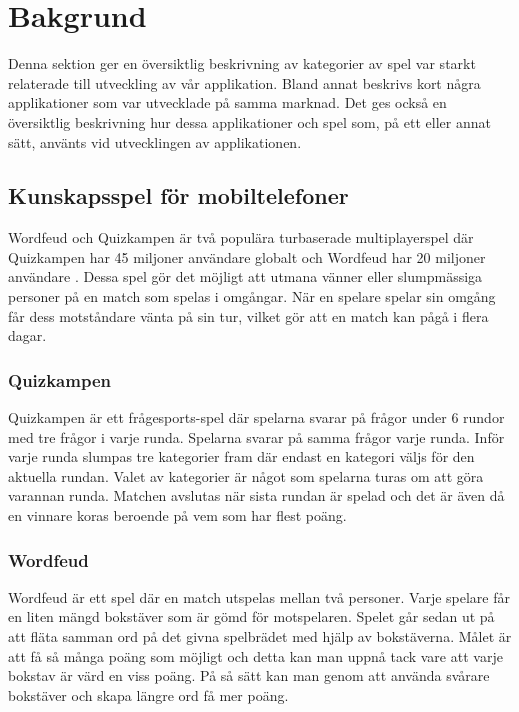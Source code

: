 \documentclass[a4paper, 11pt]{article}
\begin{document}
\section{Bakgrund}
Denna sektion ger en översiktlig beskrivning av kategorier av spel var starkt relaterade till utveckling av vår applikation. Bland annat beskrivs kort några applikationer som var utvecklade på samma marknad. Det ges också en översiktlig beskrivning hur dessa applikationer och spel som, på ett eller annat sätt, använts vid utvecklingen av applikationen. 

\subsection{Kunskapsspel för mobiltelefoner}
Wordfeud och Quizkampen är två populära turbaserade multiplayerspel där Quizkampen har 45 miljoner användare globalt \cite{quiz} och Wordfeud har 20 miljoner användare \cite{wordfeud}. Dessa spel gör det möjligt att utmana vänner eller slumpmässiga personer på en match som spelas i omgångar. När en spelare spelar sin omgång får dess motståndare vänta på sin tur, vilket gör att en match kan pågå i flera dagar.

\subsubsection{Quizkampen}
Quizkampen \cite{aboutquiz} är ett frågesports-spel där spelarna svarar på frågor under 6 rundor med tre frågor i varje runda. Spelarna svarar på samma frågor varje runda.  Inför varje runda slumpas tre kategorier fram där endast en kategori väljs för den aktuella rundan. Valet av kategorier är något som spelarna turas om att göra varannan runda. Matchen avslutas när sista rundan är spelad och det är även då en vinnare koras beroende på vem som har flest poäng. 

\subsubsection{Wordfeud}
Wordfeud \cite{aboutwordfeud} är ett spel där en match utspelas mellan två personer. Varje spelare får en liten mängd bokstäver som är gömd för motspelaren. Spelet går sedan ut på att fläta samman ord på det givna spelbrädet med hjälp av bokstäverna. Målet är att få så många poäng som möjligt och detta kan man uppnå tack vare att varje bokstav är värd en viss poäng. På så sätt kan man genom att använda svårare bokstäver och skapa längre ord få mer poäng. 
\end{document}
